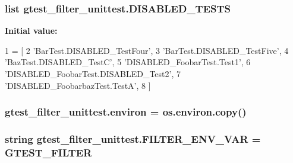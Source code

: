 \subsubsection[{\texorpdfstring{D\+I\+S\+A\+B\+L\+E\+D\+\_\+\+T\+E\+S\+TS}{DISABLED_TESTS}}]{\setlength{\rightskip}{0pt plus 5cm}list gtest\+\_\+filter\+\_\+unittest.\+D\+I\+S\+A\+B\+L\+E\+D\+\_\+\+T\+E\+S\+TS}\hypertarget{namespacegtest__filter__unittest_affe760ab1e8c4c7b61566076c37c1d69}{}\label{namespacegtest__filter__unittest_affe760ab1e8c4c7b61566076c37c1d69}
{\bfseries Initial value\+:}
\begin{DoxyCode}
1 = [
2     \textcolor{stringliteral}{'BarTest.DISABLED\_TestFour'},
3     \textcolor{stringliteral}{'BarTest.DISABLED\_TestFive'},
4     \textcolor{stringliteral}{'BazTest.DISABLED\_TestC'},
5     \textcolor{stringliteral}{'DISABLED\_FoobarTest.Test1'},
6     \textcolor{stringliteral}{'DISABLED\_FoobarTest.DISABLED\_Test2'},
7     \textcolor{stringliteral}{'DISABLED\_FoobarbazTest.TestA'},
8     ]
\end{DoxyCode}
\subsubsection[{\texorpdfstring{environ}{environ}}]{\setlength{\rightskip}{0pt plus 5cm}gtest\+\_\+filter\+\_\+unittest.\+environ = os.\+environ.\+copy()}\hypertarget{namespacegtest__filter__unittest_ab6940a12e110abdd8dea27039f4731ef}{}\label{namespacegtest__filter__unittest_ab6940a12e110abdd8dea27039f4731ef}
\subsubsection[{\texorpdfstring{F\+I\+L\+T\+E\+R\+\_\+\+E\+N\+V\+\_\+\+V\+AR}{FILTER_ENV_VAR}}]{\setlength{\rightskip}{0pt plus 5cm}string gtest\+\_\+filter\+\_\+unittest.\+F\+I\+L\+T\+E\+R\+\_\+\+E\+N\+V\+\_\+\+V\+AR = \textquotesingle{}G\+T\+E\+S\+T\+\_\+\+F\+I\+L\+T\+ER\textquotesingle{}}\hypertarget{namespacegtest__filter__unittest_a3dbe99165209787d4d138d30673c95f5}{}\label{namespacegtest__filter__unittest_a3dbe99165209787d4d138d30673c95f5}
